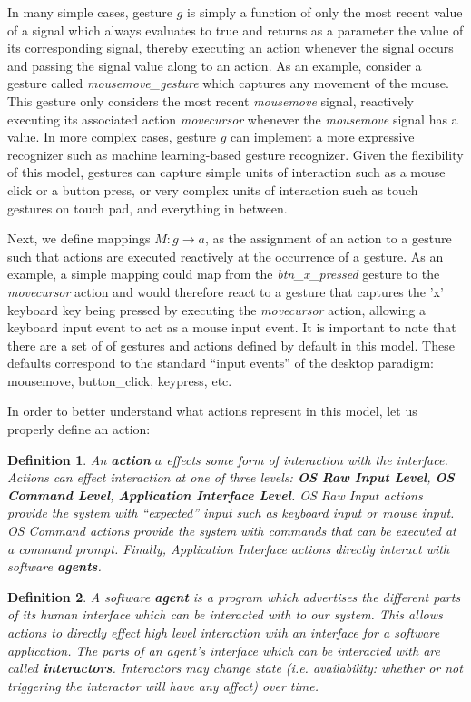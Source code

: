 \documentclass{article}
\newtheorem{define}{Definition}
\begin{document}
\noindent
In many simple cases, gesture $g$ is simply a function of only the most recent value of a signal which always evaluates to true and returns as a parameter the value of its corresponding signal, thereby executing an action whenever the signal occurs and passing the signal value along to an action.
As an example, consider a gesture called \textit{mousemove\_gesture} which captures any movement of the mouse. This gesture only considers the most recent \textit{mousemove} signal, reactively executing its associated action \textit{movecursor} whenever the \textit{mousemove} signal has a value. In more complex cases, gesture $g$ can implement a more expressive recognizer such as machine learning-based gesture recognizer. Given the flexibility of this model, gestures can capture simple units of interaction such as a mouse click or a button press, or very complex units of interaction such as touch gestures on touch pad, and everything in between.

Next, we define mappings $M: g \rightarrow a$, as the assignment of an action to a gesture such that actions are executed reactively at the occurrence of a gesture.
As an example, a simple mapping could map from the \textit{btn\_x\_pressed} gesture to the \textit{movecursor} action and would therefore react to a gesture that captures the 'x' keyboard key being pressed by executing the \textit{movecursor} action, allowing a keyboard input event to act as a mouse input event. It is important to note that there are a set of of gestures and actions defined by default in this model. These defaults correspond to the standard ``input events'' of the desktop paradigm: mousemove, button\_click, keypress, etc. 

In order to better understand what actions represent in this model, let us properly define an action:

\begin{define}
\label{def:action}
An \textbf{action} $a$ effects some form of interaction with the interface.
Actions can effect interaction at one of three levels: \textbf{OS Raw Input Level}, \textbf{OS Command Level}, \textbf{Application Interface Level}. OS Raw Input actions provide the system with ``expected'' input such as keyboard input or mouse input. OS Command actions provide the system with commands that can be executed at a command prompt. Finally, Application Interface actions directly interact with software \textbf{agents}.
\end{define}

\begin{define}
\label{def:agent}
A software \textbf{agent} is a program which advertises the different parts of its human interface which can be interacted with to our system.
This allows actions to directly effect high level interaction with an interface for a software application. The parts of an agent's interface which can be interacted with are called \textbf{interactors}. Interactors may change state (i.e. availability: whether or not triggering the interactor will have any affect) over time.
\end{define}
\end{document}
